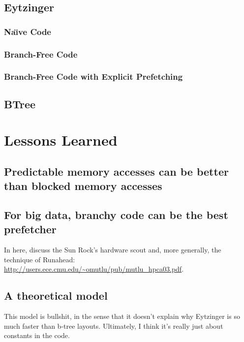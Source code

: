 \documentclass{patmorin}
\begin{document}
\subsection{Eytzinger}

\subsubsection{Na\"{\i}ve Code}

\subsubsection{Branch-Free Code}

\subsubsection{Branch-Free Code with Explicit Prefetching}

\subsection{BTree}


\section{Lessons Learned}

\subsection{Predictable memory accesses can be better than blocked
            memory accesses}

\subsection{For big data, branchy code can be the best prefetcher}

In here, discuss the Sun Rock's hardware scout and, more generally, the technique of Runahead: \url{http://users.ece.cmu.edu/~omutlu/pub/mutlu_hpca03.pdf}.

\subsection{A theoretical model}

This model is bullshit, in the sense that it doesn't explain why Eytzinger
is so much faster than b-tree layouts.  Ultimately, I think it's really just about constants in the code.
\end{document}
